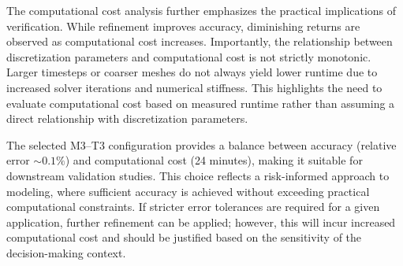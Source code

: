 



The computational cost analysis further emphasizes the practical implications of verification. While refinement improves accuracy, diminishing returns are observed as computational cost increases. Importantly, the relationship between discretization parameters and computational cost is not strictly monotonic. Larger timesteps or coarser meshes do not always yield lower runtime due to increased solver iterations and numerical stiffness. This highlights the need to evaluate computational cost based on measured runtime rather than assuming a direct relationship with discretization parameters.

The selected M3–T3 configuration provides a balance between accuracy (relative error $\sim 0.1\%$) and computational cost (24 minutes), making it suitable for downstream validation studies. This choice reflects a risk-informed approach to modeling, where sufficient accuracy is achieved without exceeding practical computational constraints. If stricter error tolerances are required for a given application, further refinement can be applied; however, this will incur increased computational cost and should be justified based on the sensitivity of the decision-making context.

